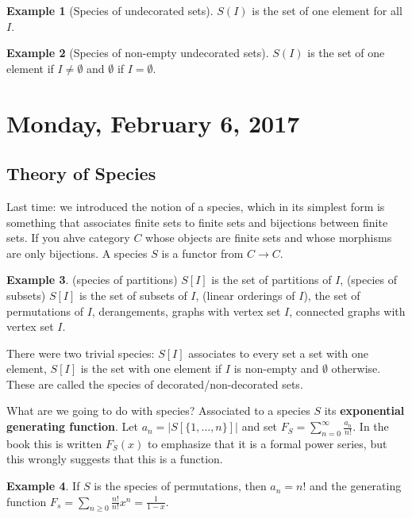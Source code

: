 \documentclass[12pt]{article}
\theoremstyle{definition}
\newtheorem{exmp}{Example}[section]
\begin{document}
\begin{exmp}[Species of undecorated sets]
    $S(I)$ is the set of one element for all $I$. 
\end{exmp}

\begin{exmp}[Species of non-empty undecorated sets]
    $S(I)$ is the set of one element if $I \ne \emptyset$ and $\emptyset$ if $I
    = \emptyset$.
\end{exmp}

\section{Monday, February 6, 2017}

\subsection{Theory of Species}

Last time: we introduced the notion of a species, which in its simplest form is
something that associates finite sets to finite sets and bijections between
finite sets. If you ahve category $C$ whose objects are finite sets and whose
morphisms are only bijections. A species $S$ is a functor from $C \rightarrow
C$.

\begin{exmp}
    (species of partitions) $S[I]$ is the set of partitions of $I$, (species of
    subsets) $S[I]$ is the set of subsets of $I$, (linear orderings of $I$),
    the set of permutations of $I$, derangements, graphs with vertex set $I$,
    connected graphs with vertex set $I$.
\end{exmp}

There were two trivial species: $S[I]$ associates to every set a set with one
element, $S[I]$ is the set with one element if $I$ is non-empty and $\emptyset$
otherwise. These are called the species of decorated/non-decorated sets.

What are we going to do with species? Associated to a species $S$ its
\textbf{exponential generating function}. Let $a_n = |S[\{1, \ldots, n\}]|$ and
set $F_S = \sum_{n = 0}^\infty \frac{a_n}{n!}$. In the book this is written
$F_S(x)$ to emphasize that it is a formal power series, but this wrongly
suggests that this is a function.

\begin{exmp}
    If $S$ is the species of permutations, then $a_n = n!$ and the generating
    function $F_s = \sum_{n \ge 0} \frac{n!}{n!} x^n = \frac{1}{1-x}$.
\end{exmp}
\end{document}
